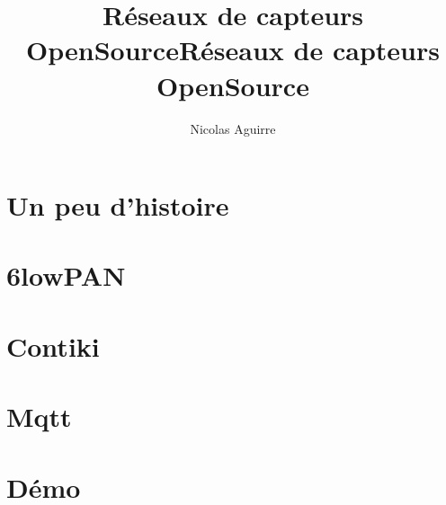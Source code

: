 \documentclass{smilebeamer}
\title{Réseaux de capteurs OpenSource}
\author{Nicolas Aguirre}
\begin{document}
\begin{frame}[plain]
  \title{Réseaux de capteurs OpenSource}
    \titlepage
\end{frame}

\section{Un peu d'histoire}






\section{6lowPAN}


\section{Contiki}








\section{Mqtt}



\section{Démo}
\end{document}

